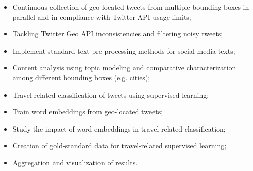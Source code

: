\begin{itemize}
	\item Continuous collection of geo-located tweets from multiple bounding boxes in parallel and in compliance with Twitter API usage limits;
	
	\item Tackling Twitter Geo API inconsistencies and filtering noisy tweets;
	
	\item Implement standard text pre-processing methods for social media texts;
	
	\item Content analysis using topic modeling and comparative characterization among different bounding boxes (e.g. cities);
	
	\item Travel-related classification of tweets using supervised learning;
	
	\item Train word embeddings from geo-located tweets;
	
	\item Study the impact of word embeddings in travel-related classification;
	
	\item Creation of gold-standard data for travel-related supervised learning;
	
	\item Aggregation and visualization of results.
\end{itemize}




